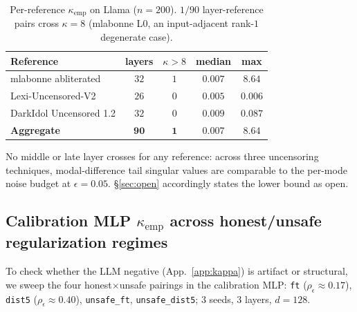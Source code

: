 \documentclass[10pt]{article}
\theoremstyle{definition}
\theoremstyle{remark}
\begin{document}
\begin{table}[h]\centering
\caption{Per-reference $\kappa_{\mathrm{emp}}$ on Llama
($n=200$). $1/90$ layer-reference pairs cross $\kappa=8$
(mlabonne L$0$, an input-adjacent rank-$1$ degenerate case).}
\label{tab:kappa_emp}
\begin{tabular}{@{}lcccc@{}}
\toprule
Reference & layers & $\kappa>8$ & median & max \\
\midrule
mlabonne abliterated     & $32$ & $1$ & $0.007$ & $8.64$ \\
Lexi-Uncensored-V2       & $26$ & $0$ & $0.005$ & $0.006$ \\
DarkIdol Uncensored 1.2  & $32$ & $0$ & $0.009$ & $0.087$ \\
\midrule
\textbf{Aggregate}       & $\mathbf{90}$ & $\mathbf{1}$ & $\mathbf{0.007}$ & $\mathbf{8.64}$ \\
\bottomrule
\end{tabular}
\end{table}

No middle or late layer crosses for any reference:
across three uncensoring techniques, modal-difference
tail singular values are comparable to the per-mode
noise budget at $\epsilon=0.05$.  \S\ref{sec:open}
accordingly states the lower bound as open.

\subsection{Calibration MLP $\kappa_{\mathrm{emp}}$ across honest/unsafe regularization regimes}
\label{app:calibration_kappa}

To check whether the LLM negative
(App.~\ref{app:kappa}) is artifact or structural, we
sweep the four honest$\times$unsafe pairings in the
calibration MLP: \texttt{ft} ($\rho_{\epsilon}\!\approx\!0.17$),
\texttt{dist5} ($\rho_{\epsilon}\!\approx\!0.40$),
\texttt{unsafe\_ft}, \texttt{unsafe\_dist5}; $3$ seeds,
$3$ layers, $d = 128$.
\end{document}
